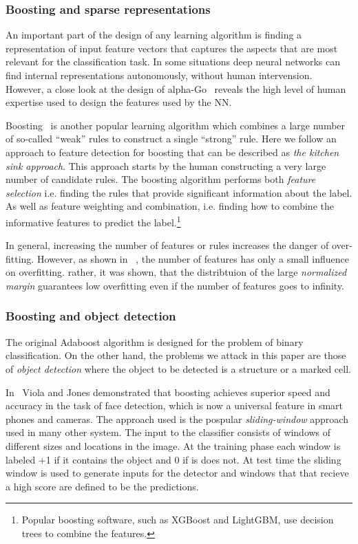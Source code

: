 \documentclass[11pt]{article}
\begin{document}
\subsubsection{Boosting and sparse representations}
An important part of the design of any learning algorithm is finding a
representation of input feature vectors that captures the aspects that are
most relevant for the classification task. In some situations deep
neural networks can find internal representations autonomously,
without human intervension. However, a close look at the design of
alpha-Go~\cite{silver2017mastering} reveals the high level of human
expertise used to design the features used by the NN.

Boosting~\cite{FreundSc97,schapire2013boosting} is another popular
learning algorithm which combines a large number of so-called ``weak''
rules to construct a single ``strong'' rule. Here we follow an
approach to feature detection for boosting that can be described as
{\em the kitchen sink approach}. This approach starts by the human
constructing a very large number of candidate rules. The boosting
algorithm performs both {\em feature selection} i.e. finding the rules
that provide significant information about the label. As well as feature weighting and
combination, i.e. finding how to combine the informative features to
predict the label.\footnote{Popular boosting software, such as XGBoost and
  LightGBM, use decision trees to combine the features.}

In general, increasing the number of features or rules increases the
danger of over-fitting. However, as shown in ~\cite{SchapireFrBaLe98}, the
number of features has only a small influence on overfitting. rather,
it was shown, that the distribtuion of the large {\em normalized
  margin} guarantees low overfitting even if the number of features
goes to infinity.


\subsubsection{Boosting and object detection}
The original Adaboost algorithm is designed for the problem of binary
classification. On the other hand, the problems we attack in this
paper are those of {\em object detection} where the object to be
detected is a structure or a marked cell.

In~\cite{violajones01} Viola and Jones demonstrated that boosting
achieves superior speed and accuracy in the task of face detection,
which is now a universal feature in smart phones and cameras.  The
approach used is the pospular {\em sliding-window} approach used in
many other system.  The input to the classifier consists of windows of
different sizes and locations in the image. At the training phase each
window is labeled +1 if it contains the object and 0 if is does
not. At test time the sliding window is used to generate inputs for
the detector and windows that that recieve a high score are defined to
be the predictions.
\end{document}
